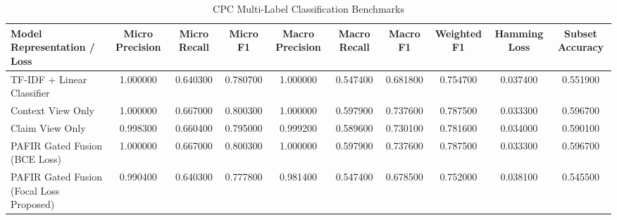 \begin{table}
\caption{CPC Multi-Label Classification Benchmarks}
\label{tab:classification_comp}
\begin{tabular}{lccccccccc}
\toprule
Model Representation / Loss & Micro Precision & Micro Recall & Micro F1 & Macro Precision & Macro Recall & Macro F1 & Weighted F1 & Hamming Loss & Subset Accuracy \\
\midrule
TF-IDF + Linear Classifier & 1.000000 & 0.640300 & 0.780700 & 1.000000 & 0.547400 & 0.681800 & 0.754700 & 0.037400 & 0.551900 \\
Context View Only & 1.000000 & 0.667000 & 0.800300 & 1.000000 & 0.597900 & 0.737600 & 0.787500 & 0.033300 & 0.596700 \\
Claim View Only & 0.998300 & 0.660400 & 0.795000 & 0.999200 & 0.589600 & 0.730100 & 0.781600 & 0.034000 & 0.590100 \\
PAFIR Gated Fusion (BCE Loss) & 1.000000 & 0.667000 & 0.800300 & 1.000000 & 0.597900 & 0.737600 & 0.787500 & 0.033300 & 0.596700 \\
PAFIR Gated Fusion (Focal Loss Proposed) & 0.990400 & 0.640300 & 0.777800 & 0.981400 & 0.547400 & 0.678500 & 0.752000 & 0.038100 & 0.545500 \\
\bottomrule
\end{tabular}
\end{table}
